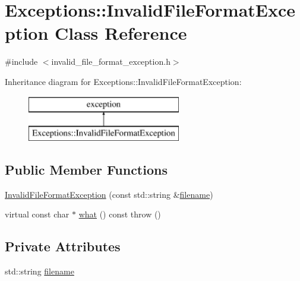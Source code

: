 \hypertarget{class_exceptions_1_1_invalid_file_format_exception}{}\section{Exceptions\+:\+:Invalid\+File\+Format\+Exception Class Reference}
\label{class_exceptions_1_1_invalid_file_format_exception}


{\ttfamily \#include $<$invalid\+\_\+file\+\_\+format\+\_\+exception.\+h$>$}

Inheritance diagram for Exceptions\+:\+:Invalid\+File\+Format\+Exception\+:\begin{figure}[H]
\begin{center}
\leavevmode
\includegraphics[height=2.000000cm]{class_exceptions_1_1_invalid_file_format_exception}
\end{center}
\end{figure}
\subsection*{Public Member Functions}
\begin{DoxyCompactItemize}
\item 
\hyperlink{class_exceptions_1_1_invalid_file_format_exception_a7696999598e515ba7fe761299d9f91a2}{Invalid\+File\+Format\+Exception} (const std\+::string \&\hyperlink{class_exceptions_1_1_invalid_file_format_exception_a7c035c95548acec2b3b3693cf746c1e2}{filename})
\item 
virtual const char $\ast$ \hyperlink{class_exceptions_1_1_invalid_file_format_exception_a31ecfcd73d0afb1e8c25e38a95b309b6}{what} () const   throw ()
\end{DoxyCompactItemize}
\subsection*{Private Attributes}
\begin{DoxyCompactItemize}
\item 
std\+::string \hyperlink{class_exceptions_1_1_invalid_file_format_exception_a7c035c95548acec2b3b3693cf746c1e2}{filename}
\end{DoxyCompactItemize}


